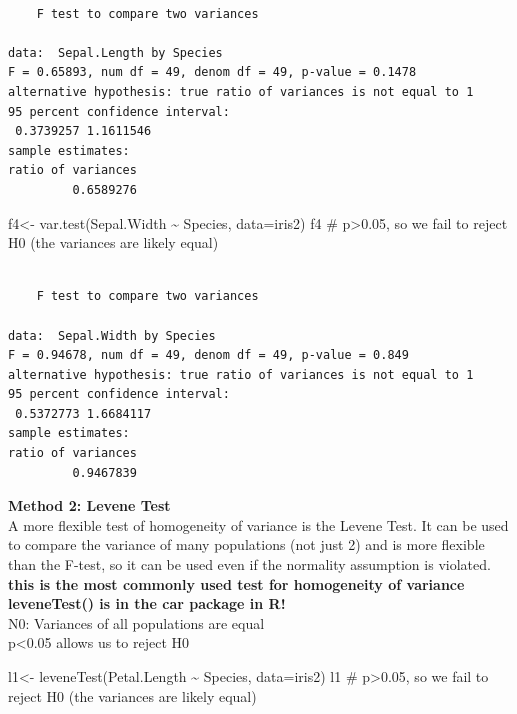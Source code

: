 \documentclass[
  letterpaper,
  DIV=11,
  numbers=noendperiod]{scrartcl}
\newenvironment{Shaded}{\begin{snugshade}}{\end{snugshade}}
\newcommand{\AttributeTok}[1]{\textcolor[rgb]{0.40,0.45,0.13}{#1}}
\newcommand{\CommentTok}[1]{\textcolor[rgb]{0.37,0.37,0.37}{#1}}
\newcommand{\FunctionTok}[1]{\textcolor[rgb]{0.28,0.35,0.67}{#1}}
\newcommand{\NormalTok}[1]{\textcolor[rgb]{0.00,0.23,0.31}{#1}}
\newcommand{\OtherTok}[1]{\textcolor[rgb]{0.00,0.23,0.31}{#1}}
\newcommand{\SpecialCharTok}[1]{\textcolor[rgb]{0.37,0.37,0.37}{#1}}
\begin{document}
\begin{verbatim}

    F test to compare two variances

data:  Sepal.Length by Species
F = 0.65893, num df = 49, denom df = 49, p-value = 0.1478
alternative hypothesis: true ratio of variances is not equal to 1
95 percent confidence interval:
 0.3739257 1.1611546
sample estimates:
ratio of variances 
         0.6589276 
\end{verbatim}

\begin{Shaded}
\begin{Highlighting}[]
\NormalTok{f4}\OtherTok{\textless{}{-}} \FunctionTok{var.test}\NormalTok{(Sepal.Width }\SpecialCharTok{\textasciitilde{}}\NormalTok{ Species, }\AttributeTok{data=}\NormalTok{iris2)}
\NormalTok{f4 }\CommentTok{\# p\textgreater{}0.05, so we fail to reject H0 (the variances are likely equal)}
\end{Highlighting}
\end{Shaded}

\begin{verbatim}

    F test to compare two variances

data:  Sepal.Width by Species
F = 0.94678, num df = 49, denom df = 49, p-value = 0.849
alternative hypothesis: true ratio of variances is not equal to 1
95 percent confidence interval:
 0.5372773 1.6684117
sample estimates:
ratio of variances 
         0.9467839 
\end{verbatim}

\hfill\break
\textbf{Method 2: Levene Test}\\
A more flexible test of homogeneity of variance is the Levene Test. It
can be used to compare the variance of many populations (not just 2) and
is more flexible than the F-test, so it can be used even if the
normality assumption is violated.\\
\textbf{this is the most commonly used test for homogeneity of
variance}\\
\textbf{leveneTest() is in the car package in R!}\\

N0: Variances of all populations are equal\\
p\textless0.05 allows us to reject H0

\begin{Shaded}
\begin{Highlighting}[]
\NormalTok{l1}\OtherTok{\textless{}{-}} \FunctionTok{leveneTest}\NormalTok{(Petal.Length }\SpecialCharTok{\textasciitilde{}}\NormalTok{ Species, }\AttributeTok{data=}\NormalTok{iris2)}
\NormalTok{l1 }\CommentTok{\# p\textgreater{}0.05, so we fail to reject H0 (the variances are likely equal)}
\end{Highlighting}
\end{Shaded}
\end{document}
